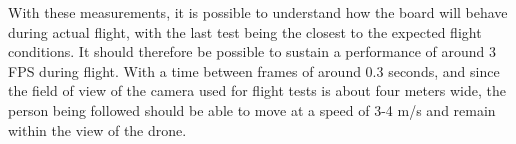 With these measurements, it is possible to understand how the board will behave during actual flight, with the last test being the closest to the expected flight conditions.
It should therefore be possible to sustain a performance of around 3 FPS during flight.
With a time between frames of around 0.3 seconds, and since the field of view of the camera used for flight tests is about four meters wide, the person being followed should be able to move at a speed of 3-4 m/s and remain within the view of the drone.




\clearpage